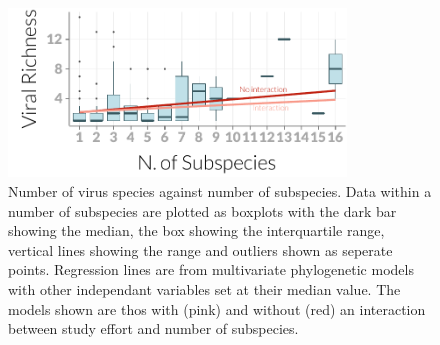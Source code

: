 \begin{knitrout}\footnotesize
{}\color{fgcolor}\begin{figure}[t]

{\centering \includegraphics[width=0.8\textwidth]{figure/boxplot-1} 

}

\caption[Number of virus species against number of subspecies]{Number of virus species against number of subspecies. 
Data within a number of subspecies are plotted as boxplots with the dark bar showing the median, the box showing the interquartile range, vertical lines showing the range and outliers shown as seperate points.
Regression lines are from multivariate phylogenetic models with other independant variables set at their median value.
The models shown are thos with (pink) and without (red) an interaction between study effort and number of subspecies.
}\label{fig:boxplot}
\end{figure}


\end{knitrout}









